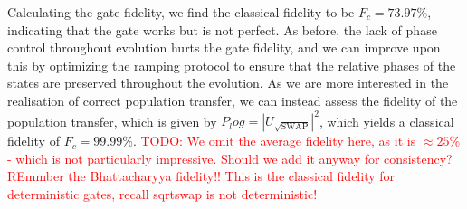 \documentclass{subfiles}
\begin{document}
Calculating the gate fidelity, we find the classical fidelity to be $F_c = 73.97\%$, indicating that the gate works but is not perfect. As before, the lack of phase control throughout evolution hurts the gate fidelity, and we can improve upon this by optimizing the ramping protocol to ensure that the relative phases of the states are preserved throughout the evolution. As we are more interested in the realisation of correct population transfer, we can instead assess the fidelity of the population transfer, which is given by $ P_log = |U_{\sqrt{\text{SWAP}}}|^2$, which yields a classical fidelity of $F_c = 99.99\%$. \textcolor{red}{TODO: We omit the average fidelity here, as it is $\approx 25\%$ - which is not particularly impressive. Should we add it anyway for consistency? REmmber the Bhattacharyya fidelity!! This is the classical fidelity for deterministic gates, recall sqrtswap is not deterministic!}
\end{document}
